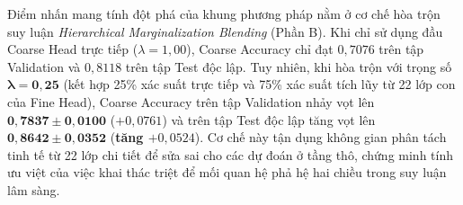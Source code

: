 \documentclass[runningheads]{llncs}
\begin{document}
Điểm nhấn mang tính đột phá của khung phương pháp nằm ở cơ chế hòa trộn suy luận \textit{Hierarchical Marginalization Blending} (Phần B). Khi chỉ sử dụng đầu Coarse Head trực tiếp ($\lambda=1{,}00$), Coarse Accuracy chỉ đạt $0{,}7076$ trên tập Validation và $0{,}8118$ trên tập Test độc lập. Tuy nhiên, khi hòa trộn với trọng số $\mathbf{\lambda = 0{,}25}$ (kết hợp 25\% xác suất trực tiếp và 75\% xác suất tích lũy từ 22 lớp con của Fine Head), Coarse Accuracy trên tập Validation nhảy vọt lên $\mathbf{0{,}7837 \pm 0{,}0100}$ ($+0{,}0761$) và trên tập Test độc lập tăng vọt lên $\mathbf{0{,}8642 \pm 0{,}0352}$ (\textbf{tăng $+0{,}0524$}). Cơ chế này tận dụng không gian phân tách tinh tế từ 22 lớp chi tiết để sửa sai cho các dự đoán ở tầng thô, chứng minh tính ưu việt của việc khai thác triệt để mối quan hệ phả hệ hai chiều trong suy luận lâm sàng.
\end{document}
